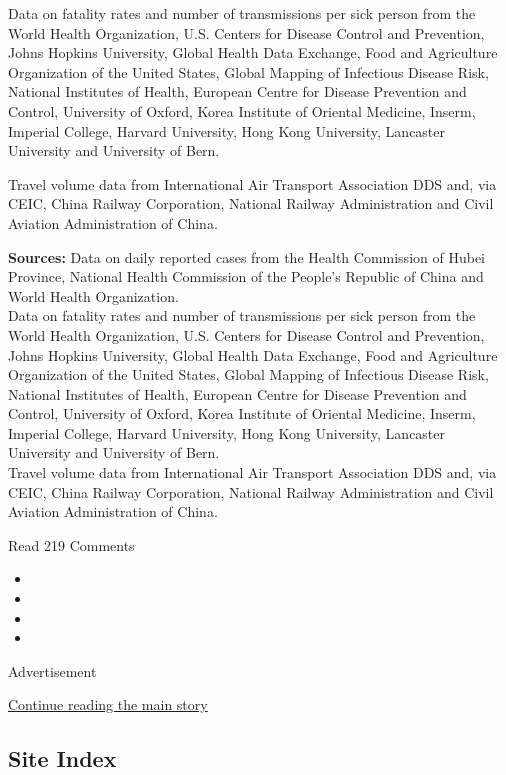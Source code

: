 Data on fatality rates and number of transmissions per sick person from
the World Health Organization, U.S. Centers for Disease Control and
Prevention, Johns Hopkins University, Global Health Data Exchange, Food
and Agriculture Organization of the United States, Global Mapping of
Infectious Disease Risk, National Institutes of Health, European Centre
for Disease Prevention and Control, University of Oxford, Korea
Institute of Oriental Medicine, Inserm, Imperial College, Harvard
University, Hong Kong University, Lancaster University and University of
Bern.

Travel volume data from International Air Transport Association DDS and,
via CEIC, China Railway Corporation, National Railway Administration and
Civil Aviation Administration of China.

\textbf{Sources:} Data on daily reported cases from the Health
Commission of Hubei Province, National Health Commission of the People's
Republic of China and World Health Organization.\\
Data on fatality rates and number of transmissions per sick person from
the World Health Organization, U.S. Centers for Disease Control and
Prevention, Johns Hopkins University, Global Health Data Exchange, Food
and Agriculture Organization of the United States, Global Mapping of
Infectious Disease Risk, National Institutes of Health, European Centre
for Disease Prevention and Control, University of Oxford, Korea
Institute of Oriental Medicine, Inserm, Imperial College, Harvard
University, Hong Kong University, Lancaster University and University of
Bern.\\
Travel volume data from International Air Transport Association DDS and,
via CEIC, China Railway Corporation, National Railway Administration and
Civil Aviation Administration of China.

Read 219 Comments

\begin{itemize}
\item
\item
\item
\item
\end{itemize}

Advertisement

\protect\hyperlink{after-bottom}{Continue reading the main story}

\hypertarget{site-index}{%
\subsection{Site Index}\label{site-index}}

